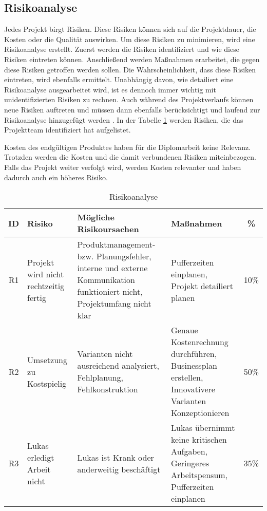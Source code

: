 \subsection{Risikoanalyse}

Jedes Projekt birgt Risiken. Diese Risiken können sich auf die Projektdauer, die Kosten oder die Qualität auswirken. Um diese Risiken zu minimieren, wird eine Risikoanalyse erstellt. Zuerst werden die Risiken identifiziert und wie diese Risiken eintreten können. Anschließend werden Maßnahmen erarbeitet, die gegen diese Risiken getroffen werden sollen. Die Wahrscheinlichkeit, dass diese Risiken eintreten, wird ebenfalls ermittelt. Unabhängig davon, wie detailiert eine Risikoanalyse ausgearbeitet wird, ist es dennoch immer wichtig mit unidentifizierten Risiken zu rechnen. Auch während des Projektverlaufs können neue Risiken auftreten und müssen dann ebenfalls berücksichtigt und laufend zur Risikoanalyse hinzugefügt werden . In der Tabelle \ref{tab:risikoanalyse} werden Risiken, die das Projektteam identifiziert hat aufgelistet.

Kosten des endgültigen Produktes haben für die Diplomarbeit keine Relevanz. Trotzden werden die Kosten und die damit verbundenen Risiken miteinbezogen. Falls das Projekt weiter verfolgt wird, werden Kosten relevanter und haben dadurch auch ein höheres Risiko.

\begin{table}[H]
  {
    \small
    \begin{tabular}{|c|p{}|p{}|p{}|c|}
      \hline
      ID & Risiko                                & Mögliche Risikoursachen                                                                                                & Maßnahmen                                                                                         & \%   \\ \hline
      R1 & Projekt wird nicht rechtzeitig fertig & Produktmanagement- bzw. Planungsfehler, interne und externe Kommunikation funktioniert nicht, Projektumfang nicht klar & Pufferzeiten einplanen, Projekt detailiert planen                                                 & 10\% \\ \hline
      R2 & Umsetzung zu Kostspielig              & Varianten nicht ausreichend analysiert, Fehlplanung, Fehlkonstruktion                                                  & Genaue Kostenrechnung durchführen, Businessplan erstellen, Innovativere Varianten Konzeptionieren & 50\% \\ \hline
      R3 & Lukas erledigt Arbeit nicht           & Lukas ist Krank oder anderweitig beschäftigt                                                                           & Lukas übernimmt keine kritischen Aufgaben, Geringeres Arbeitspensum, Pufferzeiten einplanen       & 35\% \\ \hline
    \end{tabular}}
  \caption{Risikoanalyse}
  \label{tab:risikoanalyse}
\end{table}
